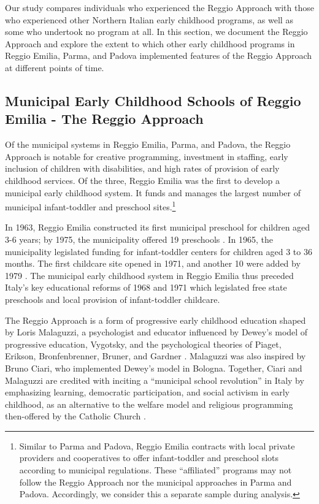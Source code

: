 Our study compares individuals who experienced the Reggio Approach with those who experienced other Northern Italian early childhood programs, as well as some who undertook no program at all. In this section, we document the Reggio Approach and explore the extent to which other early childhood programs in Reggio Emilia, Parma, and Padova implemented features of the Reggio Approach at different points of time.

\subsection{Municipal Early Childhood Schools of Reggio Emilia - The Reggio Approach}

Of the municipal systems in Reggio Emilia, Parma, and Padova, the Reggio Approach is notable for creative programming, investment in staffing, early inclusion of children with disabilities, and high rates of provision of early childhood services. Of the three, Reggio Emilia was the first to develop a municipal early childhood system. It funds and manages the largest number of municipal infant-toddler and preschool sites.\footnote{Similar to Parma and Padova, Reggio Emilia contracts with local private providers and cooperatives to offer infant-toddler and preschool slots according to municipal regulations. These ``affiliated'' programs may not follow the Reggio Approach nor the municipal approaches in Parma and Padova. Accordingly, we consider this a separate sample during analysis.} 

In 1963, Reggio Emilia constructed its first municipal preschool for children aged 3-6 years; by 1975, the municipality offered 19 preschools \citep{Hohnerlein_2009_Paradox-Public-Preschools}. In 1965, the municipality legislated funding for infant-toddler centers for children aged 3 to 36 months. The first childcare site opened in 1971, and another 10 were added by 1979 \citep{Cagliari-etal-eds_2016_BOOK_Loris-Malaguzzi}. The municipal early childhood system in Reggio Emilia thus preceded Italy's key educational reforms of 1968 and 1971 which legislated free state preschools and local provision of infant-toddler childcare.

The Reggio Approach is a form of progressive early childhood education shaped by Loris Malaguzzi, a psychologist and educator influenced by Dewey's model of progressive education, Vygotsky, and the psychological theories of Piaget, Erikson, Bronfenbrenner, Bruner, and Gardner \citep{Rinaldi_2006_ReggioEmilia_BOOK,Cagliari-etal-eds_2016_BOOK_Loris-Malaguzzi}. Malaguzzi was also inspired by Bruno Ciari, who implemented Dewey's model in Bologna. Together, Ciari and Malaguzzi are credited with inciting a ``municipal school revolution'' in Italy by emphasizing learning, democratic participation, and social activism in early childhood, as an alternative to the welfare model and religious programming then-offered by the Catholic Church \citep{Lazzari_2012_Euro-J-Edu,Cagliari-etal-eds_2016_BOOK_Loris-Malaguzzi}.

